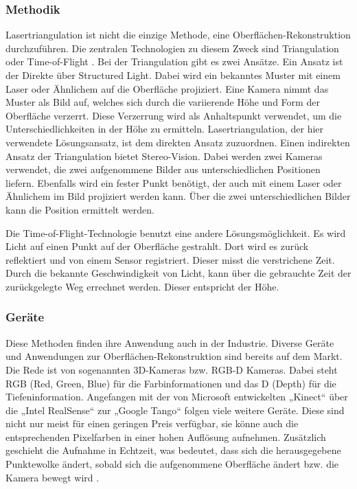 		\subsubsection{Methodik}
		Lasertriangulation ist nicht die einzige Methode, eine Oberflächen-Rekonstruktion durchzuführen. Die zentralen Technologien zu diesem Zweck sind Triangulation oder Time-of-Flight \citep[vgl.][]{state_of_art_zoll}. 
		Bei der Triangulation gibt es zwei Ansätze. Ein Ansatz ist der Direkte über Structured Light. Dabei wird ein bekanntes Muster mit einem Laser oder Ähnlichem auf die Oberfläche projiziert. Eine Kamera nimmt das Muster als Bild auf, welches sich durch die variierende Höhe und Form der Oberfläche verzerrt. Diese Verzerrung wird als Anhaltspunkt verwendet, um die Unterschiedlichkeiten in der Höhe zu ermitteln. Lasertriangulation, der hier verwendete Lösungsansatz, ist dem direkten Ansatz zuzuordnen. \newline
		Einen indirekten Ansatz der Triangulation bietet Stereo-Vision. Dabei werden zwei Kameras verwendet, die zwei aufgenommene Bilder aus unterschiedlichen Positionen liefern. Ebenfalls wird ein fester Punkt benötigt, der auch mit einem Laser oder Ähnlichem im Bild projiziert werden kann. Über die zwei unterschiedlichen Bilder kann die Position ermittelt werden.
		
		Die Time-of-Flight-Technologie benutzt eine andere Lösungsmöglichkeit. Es wird Licht auf einen Punkt auf der Oberfläche gestrahlt. Dort wird es zurück reflektiert und von einem Sensor registriert. Dieser misst die verstrichene Zeit. Durch die bekannte Geschwindigkeit von Licht, kann über die gebrauchte Zeit der zurückgelegte Weg errechnet werden. Dieser entspricht der Höhe.
	
		\subsubsection{Geräte}
		Diese Methoden finden ihre Anwendung auch in der Industrie. Diverse Geräte und Anwendungen zur Oberflächen-Rekonstruktion sind bereits auf dem Markt. Die Rede ist von sogenannten 3D-Kameras bzw. RGB-D Kameras. Dabei steht RGB (Red, Green, Blue) für die Farbinformationen und das D (Depth) für die Tiefeninformation. Angefangen mit der von Microsoft entwickelten „Kinect“ über die „Intel RealSense“ zur „Google Tango“ folgen viele weitere Geräte. Diese sind nicht nur meist für einen geringen Preis verfügbar, sie könne auch die entsprechenden Pixelfarben in einer hohen Auflösung aufnehmen.
		Zusätzlich geschieht die Aufnahme in Echtzeit, was bedeutet, dass sich die herausgegebene Punktewolke ändert, sobald sich die aufgenommene Oberfläche ändert bzw. die Kamera bewegt wird \citep[vgl.][]{state_of_art_zoll}.
			
